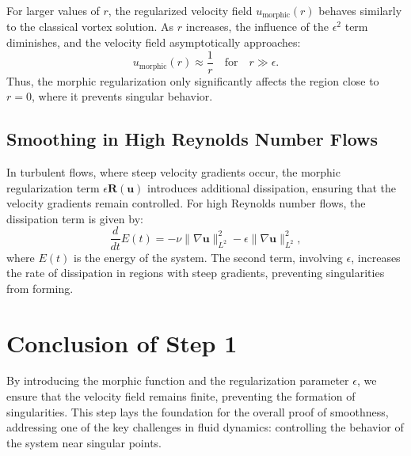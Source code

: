 \documentclass{article}
\begin{document}
For larger values of \( r \), the regularized velocity field \( u_{\text{morphic}}(r) \) behaves similarly to the classical vortex solution. As \( r \) increases, the influence of the \( \epsilon^2 \) term diminishes, and the velocity field asymptotically approaches:
\[
u_{\text{morphic}}(r) \approx \frac{1}{r} \quad \text{for} \quad r \gg \epsilon.
\]
Thus, the morphic regularization only significantly affects the region close to \( r = 0 \), where it prevents singular behavior.

\subsection*{Smoothing in High Reynolds Number Flows}

In turbulent flows, where steep velocity gradients occur, the morphic regularization term \( \epsilon \mathbf{R}(\mathbf{u}) \) introduces additional dissipation, ensuring that the velocity gradients remain controlled. For high Reynolds number flows, the dissipation term is given by:
\[
\frac{d}{dt} E(t) = - \nu \|\nabla \mathbf{u}\|_{L^2}^2 - \epsilon \|\nabla \mathbf{u}\|_{L^2}^2,
\]
where \( E(t) \) is the energy of the system. The second term, involving \( \epsilon \), increases the rate of dissipation in regions with steep gradients, preventing singularities from forming.

\section*{Conclusion of Step 1}

By introducing the morphic function and the regularization parameter \( \epsilon \), we ensure that the velocity field remains finite, preventing the formation of singularities. This step lays the foundation for the overall proof of smoothness, addressing one of the key challenges in fluid dynamics: controlling the behavior of the system near singular points.
\end{document}
